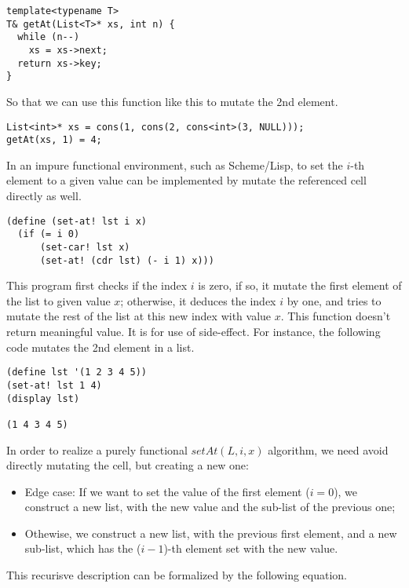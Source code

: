 \documentclass{article}
\begin{document}
\lstset{language=C++}
\begin{lstlisting}
template<typename T>
T& getAt(List<T>* xs, int n) {
  while (n--)
    xs = xs->next;
  return xs->key;
}
\end{lstlisting}

So that we can use this function like this to mutate the 2nd element.

\begin{lstlisting}
List<int>* xs = cons(1, cons(2, cons<int>(3, NULL)));
getAt(xs, 1) = 4;
\end{lstlisting}

In an impure functional environment, such as Scheme/Lisp, to set the $i$-th element to a given value can
be implemented by mutate the referenced cell directly as well.

\lstset{language=Lisp}
\begin{lstlisting}
(define (set-at! lst i x)
  (if (= i 0)
      (set-car! lst x)
      (set-at! (cdr lst) (- i 1) x)))
\end{lstlisting}

This program first checks if the index $i$ is zero, if so, it mutate the first element of the list to
given value $x$; otherwise, it deduces the index $i$ by one, and tries to mutate the rest of the 
list at this new index with value $x$. This function doesn't return meaningful value. It is for use
of side-effect. For instance, the following code mutates the 2nd element in a list.

\begin{lstlisting}
(define lst '(1 2 3 4 5))
(set-at! lst 1 4)
(display lst)

(1 4 3 4 5)
\end{lstlisting}

In order to realize a purely functional $setAt(L, i, x)$ algorithm, we need avoid directly mutating the cell,
but creating a new one:

\begin{itemize}
\item Edge case: If we want to set the value of the first element ($i = 0$), we construct a new list, with the
new value and the sub-list of the previous one;
\item Othewise, we construct a new list, with the previous first element, and a new sub-list, which has the ($i-1$)-th
element set with the new value.
\end{itemize}

This recurisve description can be formalized by the following equation.
\end{document}
